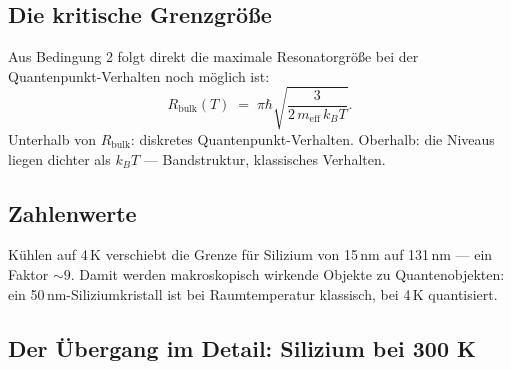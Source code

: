 \subsection{Die kritische Grenzgröße}

Aus Bedingung 2 folgt direkt die maximale Resonatorgröße
bei der Quantenpunkt-Verhalten noch möglich ist:
\begin{equation}
  \boxed{R_{\text{bulk}}(T) \;=\;
  \pi\hbar\sqrt{\frac{3}{2\,m_{\text{eff}}\,k_BT}}.}
\end{equation}
Unterhalb von $R_{\text{bulk}}$: diskretes Quantenpunkt-Verhalten.
Oberhalb: die Niveaus liegen dichter als $k_BT$ ---
Bandstruktur, klassisches Verhalten.

\subsection{Zahlenwerte}

\begin{center}
\end{center}

Kühlen auf 4\,K verschiebt die Grenze für Silizium
von 15\,nm auf 131\,nm --- ein Faktor $\sim 9$.
Damit werden makroskopisch wirkende Objekte zu Quantenobjekten:
ein 50\,nm-Siliziumkristall ist bei Raumtemperatur klassisch,
bei 4\,K quantisiert.

\subsection{Der Übergang im Detail: Silizium bei 300 K}

